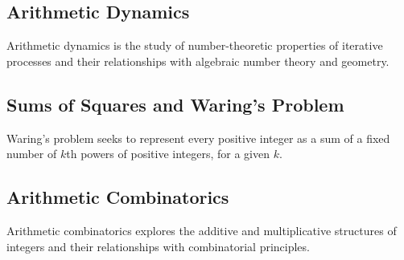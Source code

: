 \documentclass{article}
\begin{document}
\subsection{Arithmetic Dynamics}

\begin{definition}
Arithmetic dynamics is the study of number-theoretic properties of iterative processes and their relationships with algebraic number theory and geometry.
\end{definition}

\subsection{Sums of Squares and Waring's Problem}

\begin{definition}
Waring's problem seeks to represent every positive integer as a sum of a fixed number of $k$th powers of positive integers, for a given $k$.
\end{definition}

\subsection{Arithmetic Combinatorics}

\begin{definition}
Arithmetic combinatorics explores the additive and multiplicative structures of integers and their relationships with combinatorial principles.
\end{definition}
\end{document}
